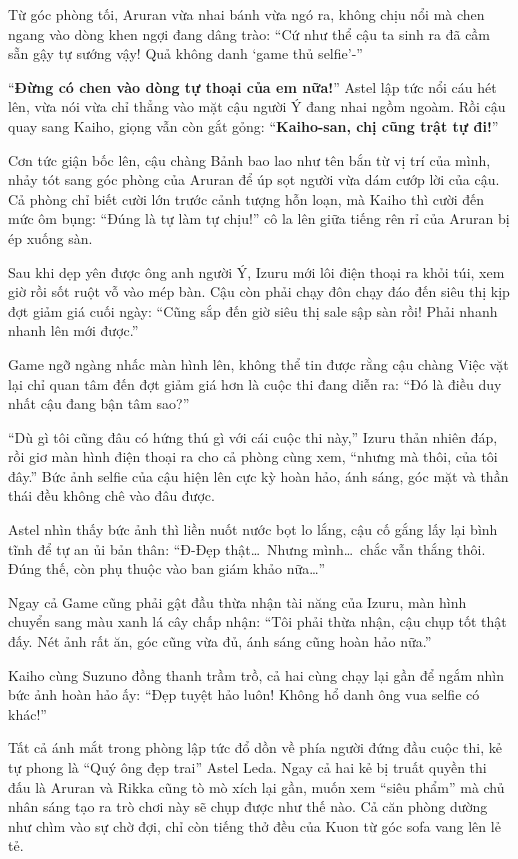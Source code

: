 \documentclass[../main.tex]{subfiles}
\begin{document}
Từ góc phòng tối, Aruran vừa nhai bánh vừa ngó ra, không chịu nổi mà chen ngang vào dòng khen ngợi đang dâng trào: ``Cứ như thể cậu ta sinh ra đã cầm sẵn gậy tự sướng vậy! Quả không danh `game thủ selfie'-''

``\textbf{Đừng có chen vào dòng tự thoại của em nữa!}'' Astel lập tức nổi cáu hét lên, vừa nói vừa chỉ thẳng vào mặt cậu người Ý đang nhai ngồm ngoàm. Rồi cậu quay sang Kaiho, giọng vẫn còn gắt gỏng: ``\textbf{Kaiho-san, chị cũng trật tự đi!}''

Cơn tức giận bốc lên, cậu chàng Bảnh bao lao như tên bắn từ vị trí của mình, nhảy tót sang góc phòng của Aruran để úp sọt người vừa dám cướp lời của cậu. Cả phòng chỉ biết cười lớn trước cảnh tượng hỗn loạn, mà Kaiho thì cười đến mức ôm bụng: ``Đúng là tự làm tự chịu!'' cô la lên giữa tiếng rên rỉ của Aruran bị ép xuống sàn.

Sau khi dẹp yên được ông anh người Ý, Izuru mới lôi điện thoại ra khỏi túi, xem giờ rồi sốt ruột vỗ vào mép bàn. Cậu còn phải chạy đôn chạy đáo đến siêu thị kịp đợt giảm giá cuối ngày: ``Cũng sắp đến giờ siêu thị sale sập sàn rồi! Phải nhanh nhanh lên mới được.''

Game ngỡ ngàng nhấc màn hình lên, không thể tin được rằng cậu chàng Việc vặt lại chỉ quan tâm đến đợt giảm giá hơn là cuộc thi đang diễn ra: ``Đó là điều duy nhất cậu đang bận tâm sao?''

``Dù gì tôi cũng đâu có hứng thú gì với cái cuộc thi này,'' Izuru thản nhiên đáp, rồi giơ màn hình điện thoại ra cho cả phòng cùng xem, ``nhưng mà thôi, của tôi đây.'' Bức ảnh selfie của cậu hiện lên cực kỳ hoàn hảo, ánh sáng, góc mặt và thần thái đều không chê vào đâu được.


Astel nhìn thấy bức ảnh thì liền nuốt nước bọt lo lắng, cậu cố gắng lấy lại bình tĩnh để tự an ủi bản thân: ``Đ-Đẹp thật\dots\ Nhưng mình\dots\ chắc vẫn thắng thôi. Đúng thế, còn phụ thuộc vào ban giám khảo nữa\dots''

Ngay cả Game cũng phải gật đầu thừa nhận tài năng của Izuru, màn hình chuyển sang màu xanh lá cây chấp nhận: ``Tôi phải thừa nhận, cậu chụp tốt thật đấy. Nét ảnh rất ăn, góc cũng vừa đủ, ánh sáng cũng hoàn hảo nữa.''

Kaiho cùng Suzuno đồng thanh trầm trồ, cả hai cùng chạy lại gần để ngắm nhìn bức ảnh hoàn hảo ấy: ``Đẹp tuyệt hảo luôn! Không hổ danh ông vua selfie có khác!''

\ct

Tất cả ánh mắt trong phòng lập tức đổ dồn về phía người đứng đầu cuộc thi, kẻ tự phong là ``Quý ông đẹp trai'' Astel Leda. Ngay cả hai kẻ bị truất quyền thi đấu là Aruran và Rikka cũng tò mò xích lại gần, muốn xem ``siêu phẩm'' mà chủ nhân sáng tạo ra trò chơi này sẽ chụp được như thế nào. Cả căn phòng dường như chìm vào sự chờ đợi, chỉ còn tiếng thở đều của Kuon từ góc sofa vang lên lẻ tẻ.
\end{document}
